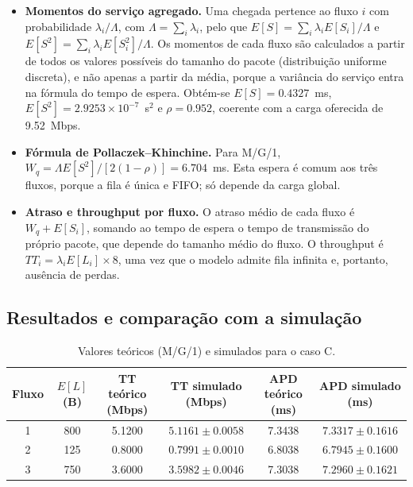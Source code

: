 \documentclass[11pt,a4paper]{article}
\begin{document}
\begin{itemize}
    \item \textbf{Momentos do serviço agregado.} Uma chegada pertence ao fluxo
    $i$ com probabilidade $\lambda_i/\Lambda$, com $\Lambda=\sum_i\lambda_i$,
    pelo que
    $E[S]=\sum_i\lambda_i E[S_i]/\Lambda$ e
    $E[S^2]=\sum_i\lambda_i E[S_i^2]/\Lambda$. Os momentos de cada fluxo são
    calculados a partir de todos os valores possíveis do tamanho do pacote
    (distribuição uniforme discreta), e não apenas a partir da média, porque a
    variância do serviço entra na fórmula do tempo de espera. Obtém-se
    $E[S]=0.4327$~ms, $E[S^2]=2.9253\times10^{-7}$~s$^2$ e $\rho=0.952$,
    coerente com a carga oferecida de 9.52~Mbps.

    \item \textbf{Fórmula de Pollaczek--Khinchine.} Para M/G/1,
    $W_q=\Lambda E[S^2]/\left[2(1-\rho)\right]=6.704$~ms. Esta espera é comum
    aos três fluxos, porque a fila é única e FIFO; só depende da carga global.

    \item \textbf{Atraso e throughput por fluxo.} O atraso médio de cada fluxo é
    $W_q+E[S_i]$, somando ao tempo de espera o tempo de transmissão do próprio
    pacote, que depende do tamanho médio do fluxo. O throughput é
    $TT_i=\lambda_iE[L_i]\times8$, uma vez que o modelo admite fila infinita e,
    portanto, ausência de perdas.
\end{itemize}

\subsection*{Resultados e comparação com a simulação}

\begin{table}[htbp]
    \centering
    \caption{Valores teóricos (M/G/1) e simulados para o caso C.}
    \label{tab:1c}
    \begin{tabular}{cccccc}
        \toprule
        Fluxo & $E[L]$ (B) & TT teórico (Mbps) & TT simulado (Mbps) & APD teórico (ms) & APD simulado (ms) \\
        \midrule
        1 & 800 & 5.1200 & $5.1161 \pm 0.0058$ & 7.3438 & $7.3317 \pm 0.1616$ \\
        2 & 125 & 0.8000 & $0.7991 \pm 0.0010$ & 6.8038 & $6.7945 \pm 0.1600$ \\
        3 & 750 & 3.6000 & $3.5982 \pm 0.0046$ & 7.3038 & $7.2960 \pm 0.1621$ \\
        \bottomrule
    \end{tabular}
\end{table}
\end{document}
